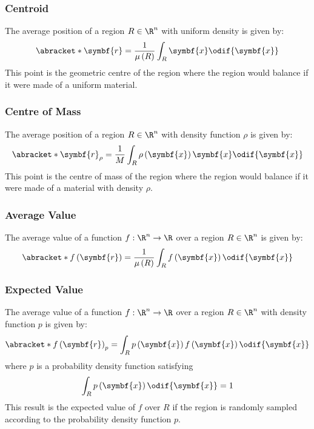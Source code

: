 \documentclass{article}
\begin{document}
\subsubsection*{Centroid}
The average position of a region \(R \in \R^n\) with uniform density is
given by:
\begin{equation*}
    \abracket*{\symbf{r}} = \frac{1}{\mu\left( R \right)} \int_R \symbf{x} \odif{\symbf{x}}
\end{equation*}
This point is the geometric centre of the region where the region would
balance if it were made of a uniform material.
\subsubsection*{Centre of Mass}
The average position of a region \(R \in \R^n\) with density function
\(\rho\) is given by:
\begin{equation*}
    \abracket*{\symbf{r}}_\rho = \frac{1}{M} \int_R \rho\left( \symbf{x} \right) \symbf{x} \odif{\symbf{x}}
\end{equation*}
This point is the centre of mass of the region where the region would
balance if it were made of a material with density \(\rho\).
\subsubsection*{Average Value}
The average value of a function \(f : \R^n \to \R\) over a region \(R
\in \R^n\) is given by:
\begin{equation*}
    \abracket*{f\left( \symbf{r} \right)} = \frac{1}{\mu\left( R \right)} \int_R f\left( \symbf{x} \right) \odif{\symbf{x}}
\end{equation*}
\subsubsection*{Expected Value}
The average value of a function \(f : \R^n \to \R\) over a region \(R
\in \R^n\) with density function \(p\) is given by:
\begin{equation*}
    \abracket*{f\left( \symbf{r} \right)}_p = \int_R p\left( \symbf{x} \right) f\left( \symbf{x} \right) \odif{\symbf{x}}
\end{equation*}
where \(p\) is a probability density function satisfying
\begin{equation*}
    \int_R p\left( \symbf{x} \right) \odif{\symbf{x}} = 1
\end{equation*}
This result is the expected value of \(f\) over \(R\) if the region
is randomly sampled according to the probability density function \(p\).
\end{document}
